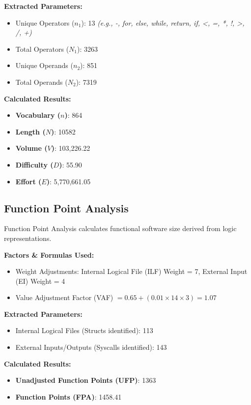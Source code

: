 \documentclass[12pt]{article}
\begin{document}
\textbf{Extracted Parameters:}
\begin{itemize}
    \item Unique Operators ($n_1$): 13 \textit{(e.g., -, for, else, while, return, if, <, =, *, !, >, /, +)}
    \item Total Operators ($N_1$): 3263
    \item Unique Operands ($n_2$): 851
    \item Total Operands ($N_2$): 7319
\end{itemize}

\textbf{Calculated Results:}
\begin{itemize}
    \item \textbf{Vocabulary ($n$)}: 864
    \item \textbf{Length ($N$)}: 10582
    \item \textbf{Volume ($V$)}: 103,226.22
    \item \textbf{Difficulty ($D$)}: 55.90
    \item \textbf{Effort ($E$)}: 5,770,661.05
\end{itemize}

\subsection{Function Point Analysis}
Function Point Analysis calculates functional software size derived from logic representations.

\textbf{Factors \& Formulas Used:}
\begin{itemize}
    \item Weight Adjustments: Internal Logical File (ILF) Weight = 7, External Input (EI) Weight = 4
    \item Value Adjustment Factor (VAF) $= 0.65 + (0.01 \times 14 \times 3) = 1.07$
\end{itemize}

\textbf{Extracted Parameters:}
\begin{itemize}
    \item Internal Logical Files (Structs identified): 113
    \item External Inputs/Outputs (Syscalls identified): 143
\end{itemize}

\textbf{Calculated Results:}
\begin{itemize}
    \item \textbf{Unadjusted Function Points (UFP)}: 1363
    \item \textbf{Function Points (FPA)}: 1458.41
\end{itemize}
\end{document}
